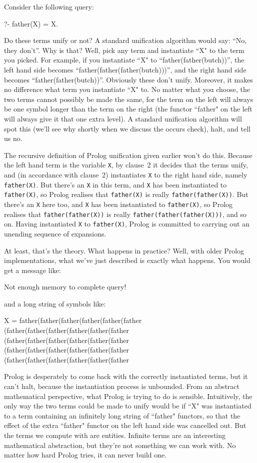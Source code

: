 Consider the following query:
\begin{LPNcodedisplay}
?- father(X) = X.
\end{LPNcodedisplay}
%
Do these terms unify or not?  A standard unification algorithm would
say: ``No, they don't''. Why is that? Well, pick any term and instantiate ``X"
to the term you picked.  For example, if you instantiate ``X" to
``father(father(butch))'', the left hand side becomes
``father(father(father(butch)))'', and the right hand side becomes
``father(father(butch))''. Obviously these don't unify. Moreover, it
makes no difference what term you instantiate ``X" to.  No matter what
you choose, the two terms cannot possibly be made the same, for the
term on the left will always be one symbol longer than the term on the
right (the functor ``father" on the left will always give it that one
extra level). A standard unification
algorithm will spot this (we'll see why shortly when we discuss the
occurs check), halt, and tell us no.

The recursive definition of Prolog unification given earlier won't do
this. Because the left hand term is the variable \texttt{X}, by
clause~2 it decides that the terms  unify, and (in
accordance with clause~2) instantiates \texttt{X} to the right hand
side, namely \texttt{father(X)}. But there's an \texttt{X} in this
term, and \texttt{X} has been instantiated to \texttt{father(X)}, so
Prolog realises that \texttt{father(X)} is really
\texttt{father(father(X))}.  But there's an \texttt{X} here too, and
\texttt{X} has been instantiated to \texttt{father(X)}, so Prolog
realises that \texttt{father(father(X))} is really
\texttt{father(father(father(X)))}, and so on. Having instantiated
\texttt{X} to \texttt{father(X)}, Prolog is committed to carrying out
an unending sequence of expansions.

At least, that's the theory. What happens in practice?  Well, with
older Prolog implementations, what we've just described is exactly
what happens.  You would get a message like:
\begin{LPNcodedisplay}
Not enough memory to complete query!
\end{LPNcodedisplay}
%
and a long string of symbols like:
\begin{LPNcodedisplay}
X = father(father(father(father(father(father
   (father(father(father(father(father(father
   (father(father(father(father(father(father
   (father(father(father(father(father(father
   (father(father(father(father(father(father
\end{LPNcodedisplay}
Prolog is desperately  to come back with the correctly
instantiated terms, but it can't halt, because the instantiation
process is unbounded. From an abstract mathematical perspective, what
Prolog is trying to do  is sensible. Intuitively, the only way the
two terms could be made to unify would be if ``X" was instantiated to a
term containing an infinitely long string of ``father" functors, so
that the effect of the extra ``father" functor on the left hand side
was cancelled out.  But the terms we compute with are 
entities. Infinite terms are an interesting mathematical abstraction,
but they're not something we can work with.  No matter how hard Prolog
tries, it can never build one.

